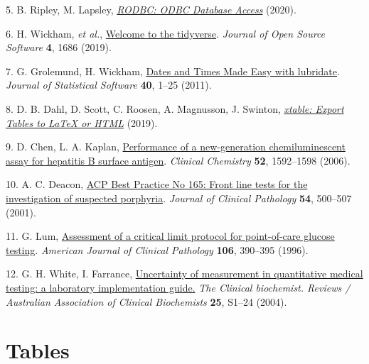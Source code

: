 \documentclass[review]{elsarticle}
\begin{document}
\hypertarget{citeproc_bib_item_5}{5.  B. Ripley, M. Lapsley, \textit{\href{https://CRAN.R-project.org/package=RODBC}{RODBC: ODBC Database Access}} (2020).}

\hypertarget{citeproc_bib_item_6}{6.  H. Wickham, \textit{et al.}, \href{https://doi.org/10.21105/joss.01686}{Welcome to the tidyverse}. \textit{Journal of Open Source Software} \textbf{4}, 1686 (2019).}

\hypertarget{citeproc_bib_item_7}{7.  G. Grolemund, H. Wickham, \href{https://www.jstatsoft.org/v40/i03/}{Dates and Times Made Easy with lubridate}. \textit{Journal of Statistical Software} \textbf{40}, 1–25 (2011).}

\hypertarget{citeproc_bib_item_8}{8.  D. B. Dahl, D. Scott, C. Roosen, A. Magnusson, J. Swinton, \textit{\href{https://CRAN.R-project.org/package=xtable}{xtable: Export Tables to LaTeX or HTML}} (2019).}

\hypertarget{citeproc_bib_item_9}{9.  D. Chen, L. A. Kaplan, \href{https://doi.org/10.1373/clinchem.2005.064063}{Performance of a new-generation chemiluminescent assay for hepatitis B surface antigen}. \textit{Clinical Chemistry} \textbf{52}, 1592–1598 (2006).}

\hypertarget{citeproc_bib_item_10}{10.  A. C. Deacon, \href{https://doi.org/10.1136/jcp.54.7.500}{ACP Best Practice No 165: Front line tests for the investigation of suspected porphyria}. \textit{Journal of Clinical Pathology} \textbf{54}, 500–507 (2001).}

\hypertarget{citeproc_bib_item_11}{11.  G. Lum, \href{https://doi.org/10.1093/ajcp/106.3.390}{Assessment of a critical limit protocol for point-of-care glucose testing}. \textit{American Journal of Clinical Pathology} \textbf{106}, 390–395 (1996).}

\hypertarget{citeproc_bib_item_12}{12.  G. H. White, I. Farrance, \href{https://www.ncbi.nlm.nih.gov/pubmed/18650962}{Uncertainty of measurement in quantitative medical testing: a laboratory implementation guide.} \textit{The Clinical biochemist. Reviews / Australian Association of Clinical Biochemists} \textbf{25}, S1–24 (2004).}
\clearpage 

\section*{Tables}
\label{sec:org5be7d93}
\end{document}
